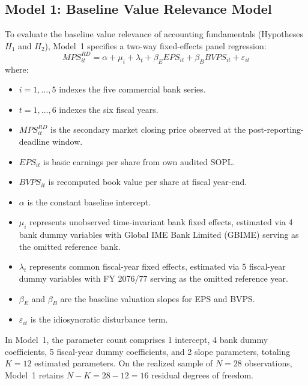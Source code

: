 \subsection{Model 1: Baseline Value Relevance Model}
To evaluate the baseline value relevance of accounting fundamentals (Hypotheses~$H_1$ and $H_2$), Model~1 specifies a two-way fixed-effects panel regression:
\begin{equation}
\mathit{MPS}^{RD}_{it} = \alpha + \mu_i + \lambda_t + \beta_E \mathit{EPS}_{it} + \beta_B \mathit{BVPS}_{it} + \varepsilon_{it}
\label{eq:fe_model1}
\end{equation}
where:
\begin{itemize}
    \item $i = 1, \dots, 5$ indexes the five commercial bank series.
    \item $t = 1, \dots, 6$ indexes the six fiscal years.
    \item $\mathit{MPS}^{RD}_{it}$ is the secondary market closing price observed at the post-reporting-deadline window.
    \item $\mathit{EPS}_{it}$ is basic earnings per share from own audited SOPL.
    \item $\mathit{BVPS}_{it}$ is recomputed book value per share at fiscal year-end.
    \item $\alpha$ is the constant baseline intercept.
    \item $\mu_i$ represents unobserved time-invariant bank fixed effects, estimated via 4 bank dummy variables with Global IME Bank Limited (GBIME) serving as the omitted reference bank.
    \item $\lambda_t$ represents common fiscal-year fixed effects, estimated via 5 fiscal-year dummy variables with FY 2076/77 serving as the omitted reference year.
    \item $\beta_E$ and $\beta_B$ are the baseline valuation slopes for EPS and BVPS.
    \item $\varepsilon_{it}$ is the idiosyncratic disturbance term.
\end{itemize}

In Model~1, the parameter count comprises 1 intercept, 4 bank dummy coefficients, 5 fiscal-year dummy coefficients, and 2 slope parameters, totaling $K = 12$ estimated parameters. On the realized sample of $N = 28$ observations, Model~1 retains $N - K = 28 - 12 = 16$ residual degrees of freedom.

